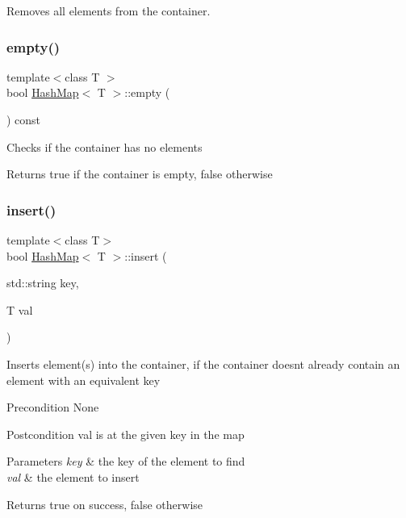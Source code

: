 Removes all elements from the container. \mbox{\label{class_hash_map_a6dfff726611e1ae80744fc54947b424b}} 
\subsubsection{\texorpdfstring{empty()}{empty()}}
{\footnotesize\ttfamily template$<$class T $>$ \\
bool \hyperlink{class_hash_map}{Hash\+Map}$<$ T $>$\+::empty (\begin{DoxyParamCaption}{ }\end{DoxyParamCaption}) const}

Checks if the container has no elements \begin{DoxyReturn}{Returns}
true if the container is empty, false otherwise 
\end{DoxyReturn}
\mbox{\label{class_hash_map_afc54cf92ed5d52409460f2b1de4d8ecd}} 
\subsubsection{\texorpdfstring{insert()}{insert()}}
{\footnotesize\ttfamily template$<$class T$>$ \\
bool \hyperlink{class_hash_map}{Hash\+Map}$<$ T $>$\+::insert (\begin{DoxyParamCaption}\item[{std\+::string}]{key,  }\item[{T}]{val }\end{DoxyParamCaption})}

Inserts element(s) into the container, if the container doesn\textquotesingle{}t already contain an element with an equivalent key \begin{DoxyPrecond}{Precondition}
None 
\end{DoxyPrecond}
\begin{DoxyPostcond}{Postcondition}
val is at the given key in the map 
\end{DoxyPostcond}

\begin{DoxyParams}{Parameters}
{\em key} & the key of the element to find \\
\hline
{\em val} & the element to insert \\
\hline
\end{DoxyParams}
\begin{DoxyReturn}{Returns}
true on success, false otherwise 
\end{DoxyReturn}
\mbox{\label{class_hash_map_a1966ffac76bb402b771945c11b8b719a}} 
